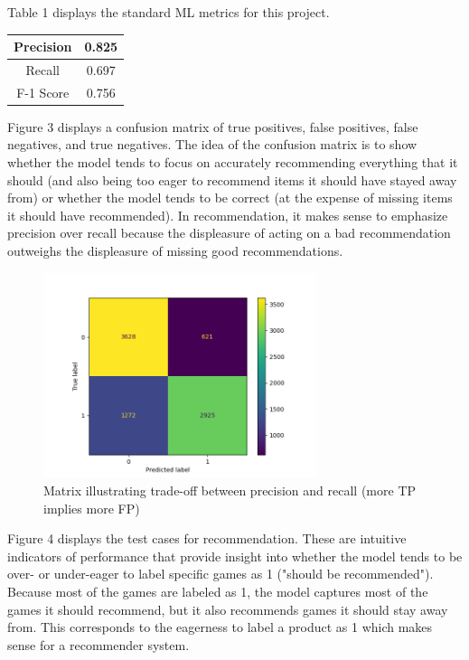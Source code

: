 \documentclass[10pt,twocolumn]{article}
\begin{document}
Table 1 displays the standard ML metrics for this project.

\begin{center}
\begin{tabular} { |c|c| } 
  \hline
  Precision & 0.825 \\ 
  \hline
  Recall & 0.697 \\ 
  \hline
  F-1 Score & 0.756 \\ 
  \hline
\end{tabular}
\end{center}

Figure 3 displays a confusion matrix of true positives, false positives, false negatives, and true negatives. The idea of the confusion matrix is to show whether the model tends to focus on accurately recommending everything that it should (and also being too eager to recommend items it should have stayed away from) or whether the model tends to be correct (at the expense of missing items it should have recommended). In recommendation, it makes sense to emphasize precision over recall because the displeasure of acting on a bad recommendation outweighs the displeasure of missing good recommendations. 

\begin{figure}[h!]
\includegraphics[width=8cm, height=6cm]{conf_matrix_visual.png}
\centering
\caption{Matrix illustrating trade-off between precision and recall (more TP implies more FP)}
\end{figure}

Figure 4 displays the test cases for recommendation. These are intuitive indicators of performance that provide insight into whether the model tends to be over- or under-eager to label specific games as 1 ("should be recommended"). Because most of the games are labeled as 1, the model captures most of the games it should recommend, but it also recommends games it should stay away from. This corresponds to the eagerness to label a product as 1 which makes sense for a recommender system. 
\end{document}
